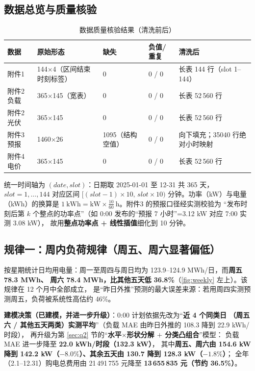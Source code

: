 \documentclass[12pt,a4paper,fontset=fandol]{ctexart}
\begin{document}
\subsection{数据总览与质量核验}

\begin{table}[htbp]
\centering
\caption{数据质量核验结果（清洗前后\nobreak）}
\label{tab:quality}
\begin{tabular}{@{}lllll@{}}
\toprule
数据 & 原始形态 & 缺失 & 负值/重复 & 清洗后 \\
\midrule
附件1 & 144$\times$4（区间结束时刻标签\nobreak） & 0 & 0 / 0 & 长表 144 行（slot 1--144\nobreak） \\
附件2 负载 & 365$\times$145（宽表\nobreak） & 0 & 0 / 0 & 长表 52\,560 行 \\
附件2 光伏 & 365$\times$145 & 0 & 0 / 0 & 长表 52\,560 行 \\
附件3 预报 & 1460$\times$26 & 1095（结构空值\nobreak） & 0 / 0 & 向下填充\nobreak；35040 行绝对小时映射 \\
附件4 电价 & 365$\times$145 & 0 & 0 / 0 & 长表 52\,560 行 \\
\bottomrule
\end{tabular}
\end{table}

统一时间轴为 $(date,slot)$\nobreak：日期取 2025-01-01 至 12-31 共 365 天\nobreak，$slot=1,\dots,144$
对应区间 $[(slot-1)\times10,\,slot\times10)$ 分钟\nobreak。功率（kW\nobreak）与电量（kWh\nobreak）的换算是
$1\ \text{kWh}=\text{kW}\times\frac{10}{60}\ \text{h}$\nobreak。附件3 的预报口径经实测校验为
“发布时刻后第 $k$ 个整点的功率点\nobreak”（如 0:00 发布的“预报 7 小时\nobreak”=3.12 kW 对应 7:00 实测 3.08 kW\nobreak）\nobreak，
故用\textbf{整点功率点 + 线性插值}细化到 10 分钟\nobreak。

\subsection{规律一\nobreak：周内负荷规律（周五\nobreak、周六显著偏低\nobreak）}

按星期统计日均用电量\nobreak：周一至周四与周日均为 123.9--124.9 MWh/日\nobreak，而\textbf{周五 78.3 MWh\nobreak、
周六 78.4 MWh\nobreak，比其他五天低 36.8\%}（\cref{fig:weekly} 左上\nobreak）\nobreak。该规律在 12 个月中全部成立\nobreak，
是“昨日外推\nobreak”预测的最大误差来源\nobreak：若用周四实测预测周五\nobreak，负荷被系统性高估约 46\%\nobreak。

\textbf{建模决策（已建模\nobreak，并进一步升级\nobreak）}\nobreak：0:00 计划依据先改为“\textbf{近 4 个同类日
（周五六 / 其他五天两类\nobreak）实测平均}\nobreak”（负载 MAE 由昨日外推的 108.3 降到 22.9 kWh/时段\nobreak）\nobreak，
再升级为第 \ref{sec:q2} 节的“\textbf{水平$\times$形状分解 $+$ 分类凸组合}\nobreak”模型\nobreak：
负载 MAE 进一步降至 \textbf{22.0 kWh/时段（132.3 kW\nobreak）}\nobreak，
其中\textbf{周五\nobreak、周六由 154.6 kW 降到 142.2 kW（$-8.0\%$\nobreak）\nobreak、其余五天由 130.7 降到 128.3 kW（$-1.8\%$\nobreak）}\nobreak；
全年（2.1--12.31\nobreak）购电总费用由 21\,491\,755 元降至 \textbf{13\,655\,835 元（节约 36.5\%\nobreak）}\nobreak。
\end{document}
